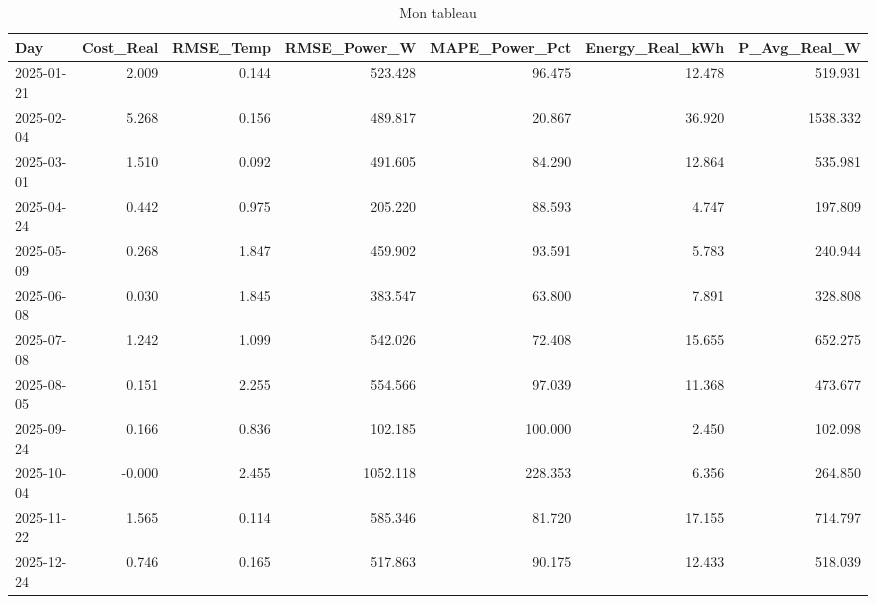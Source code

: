 \begin{table}
\caption{Mon tableau}
\label{tab:mon_tableau}
\begin{tabular}{lrrrrrr}
\toprule
Day & Cost_Real & RMSE_Temp & RMSE_Power_W & MAPE_Power_Pct & Energy_Real_kWh & P_Avg_Real_W \\
\midrule
2025-01-21 & 2.009 & 0.144 & 523.428 & 96.475 & 12.478 & 519.931 \\
2025-02-04 & 5.268 & 0.156 & 489.817 & 20.867 & 36.920 & 1538.332 \\
2025-03-01 & 1.510 & 0.092 & 491.605 & 84.290 & 12.864 & 535.981 \\
2025-04-24 & 0.442 & 0.975 & 205.220 & 88.593 & 4.747 & 197.809 \\
2025-05-09 & 0.268 & 1.847 & 459.902 & 93.591 & 5.783 & 240.944 \\
2025-06-08 & 0.030 & 1.845 & 383.547 & 63.800 & 7.891 & 328.808 \\
2025-07-08 & 1.242 & 1.099 & 542.026 & 72.408 & 15.655 & 652.275 \\
2025-08-05 & 0.151 & 2.255 & 554.566 & 97.039 & 11.368 & 473.677 \\
2025-09-24 & 0.166 & 0.836 & 102.185 & 100.000 & 2.450 & 102.098 \\
2025-10-04 & -0.000 & 2.455 & 1052.118 & 228.353 & 6.356 & 264.850 \\
2025-11-22 & 1.565 & 0.114 & 585.346 & 81.720 & 17.155 & 714.797 \\
2025-12-24 & 0.746 & 0.165 & 517.863 & 90.175 & 12.433 & 518.039 \\
\bottomrule
\end{tabular}
\end{table}

